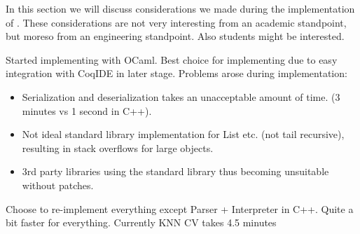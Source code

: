 \label{section:implementation}

In this section we will discuss considerations we made during the implementation of \roerei.
These considerations are not very interesting from an academic standpoint, but moreso from an engineering standpoint.
Also students might be interested.

Started implementing with OCaml.
Best choice for implementing due to easy integration with CoqIDE in later stage.
Problems arose during implementation:
\begin{itemize}
\item Serialization and deserialization takes an unacceptable amount of time. (3 minutes vs 1 second in C++).
\item Not ideal standard library implementation for List etc. (not tail recursive), resulting in stack overflows for large objects.
\item 3rd party libraries using the standard library thus becoming unsuitable without patches.
\end{itemize}

Choose to re-implement everything except Parser + Interpreter in C++.
Quite a bit faster for everything.
Currently KNN CV takes 4.5 minutes

